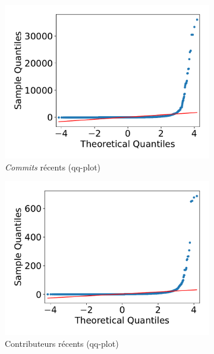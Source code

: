 \documentclass[dvipsnames,runningheads]{llncs}
\newcommand{\en}[1]{\foreignlanguage{english}{\emph{#1}}}
\begin{document}
\begin{figure}[ht]
        \begin{subfigure}[t]{0.333\textwidth}
            \includegraphics[width=\textwidth]{../experiment/data_analysis/recentCommitCount_qqplot}
            \caption{\en{Commits} récents (qq-plot)}
        \end{subfigure}
        \begin{subfigure}[t]{0.333\textwidth}
            \includegraphics[width=\textwidth]{../experiment/data_analysis/recentContributorCount_qqplot}
            \caption{Contributeurs récents (qq-plot)}
        \end{subfigure}%
        \begin{subfigure}[t]{0.333\textwidth}

\end{subfigure}
\end{figure}
\end{document}
